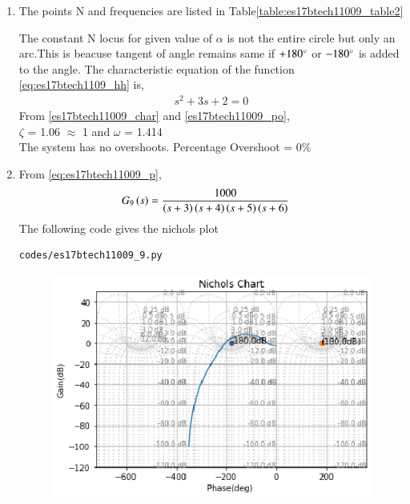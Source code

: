 \begin{enumerate}[label=\thesection.\arabic*.,ref=\thesection.\theenumi]
\begin{table}[!ht]
\label{table:es17btech11009_table1}
\end{table}
\item
The points N and frequencies are listed in Table\ref{table:es17btech11009_table2}
\begin{table}[!ht]
\centering

\caption{}
\label{table:es17btech11009_table2}
\end{table}
The constant N locus for given value of $\alpha$ is not the entire circle but only an arc.This is beacuse tangent of angle remains same if $+180\degree$ or 
$-180\degree$ is added to the angle.
The characteristic equation of the function \eqref{eq:es17btech1109_hh} is,
\begin{align}
 s^2 + 3s + 2 = 0
 \end{align}
From \eqref{es17btech11009_char} and \eqref{es17btech11009_po},
\\
  $\zeta$ = 1.06 $\approx$ 1 and $\omega$ = 1.414
  \\
  The system has no overshoots.
  Percentage Overshoot = 0\%
\item
From \eqref{eq:es17btech11009_p},
\begin{align}
G_9\brak{s} &=\frac{1000}{\brak{s+3}\brak{s+4}\brak{s+5}\brak{s+6}}
\label{eq:es17btech11009_ii}
\end{align}
\solution 
The following code gives the nichols plot
\begin{lstlisting}
codes/es17btech11009_9.py
\end{lstlisting}
\begin{figure}[!h]
\includegraphics[width=\columnwidth]{./figs/es17btech11009_9.eps}
\caption{}
\label{fig:es17btech11009_9}

\end{figure}
\end{enumerate}
